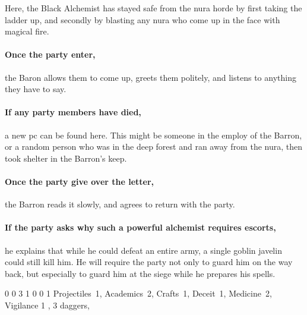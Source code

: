 \begin{multicols}{2}
\begin{enumerate}
\end{enumerate}


Here, the Black Alchemist has stayed safe from the nura horde by first taking the ladder up, and secondly by blasting any nura who come up in the face with magical fire.

\paragraph{Once the party enter,}
the Baron allows them to come up, greets them politely, and listens to anything they have to say.


\paragraph{If any party members have died,}
a new \gls{pc} can be found here.
This might be someone in the employ of the Barron, or a random person who was in the deep forest and ran away from the nura, then took shelter in the Barron's keep.

\paragraph{Once the party give over the letter,}
the Barron reads it slowly, and agrees to return with the party.

\paragraph{If the party asks why such a powerful alchemist requires escorts,}
he explains that while he could defeat an entire army, a single goblin javelin could still kill him.
He will require the party not only to guard him on the way back, but especially to guard him at the siege while he prepares his spells.

{0}%
{0}%
{{3}%
{1}%
{0}}%
{0}%
{1}%
{Projectiles~1, Academics~2, Crafts~1, Deceit~1, Medicine~2, Vigilance 1
\knacks{\alchemist, \bloodCaster}
}%
{\shortsword, 3 daggers, \partialleather}%
{\addtocounter{fp}{10}}

\end{multicols}

